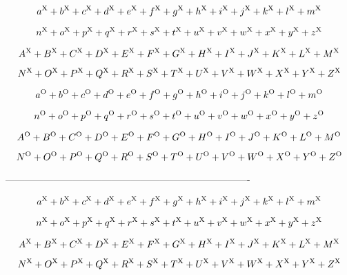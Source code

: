 

$$
a^{\rm X}+
b^{\rm X}+
c^{\rm X}+
d^{\rm X}+
e^{\rm X}+
f^{\rm X}+
g^{\rm X}+
h^{\rm X}+
i^{\rm X}+
j^{\rm X}+
k^{\rm X}+
l^{\rm X}+
m^{\rm X}
$$

$$n^{\rm X}+
o^{\rm X}+
p^{\rm X}+
q^{\rm X}+
r^{\rm X}+
s^{\rm X}+
t^{\rm X}+
u^{\rm X}+
v^{\rm X}+
w^{\rm X}+
x^{\rm X}+
y^{\rm X}+
z^{\rm X}
$$

$$
A^{\rm X}+
B^{\rm X}+
C^{\rm X}+
D^{\rm X}+
E^{\rm X}+
F^{\rm X}+
G^{\rm X}+
H^{\rm X}+
I^{\rm X}+
J^{\rm X}+
K^{\rm X}+
L^{\rm X}+
M^{\rm X}
$$

$$
N^{\rm X}+
O^{\rm X}+
P^{\rm X}+
Q^{\rm X}+
R^{\rm X}+
S^{\rm X}+
T^{\rm X}+
U^{\rm X}+
V^{\rm X}+
W^{\rm X}+
X^{\rm X}+
Y^{\rm X}+
Z^{\rm X}
$$


$$
a^{\rm O}+
b^{\rm O}+
c^{\rm O}+
d^{\rm O}+
e^{\rm O}+
f^{\rm O}+
g^{\rm O}+
h^{\rm O}+
i^{\rm O}+
j^{\rm O}+
k^{\rm O}+
l^{\rm O}+
m^{\rm O}
$$

$$
n^{\rm O}+
o^{\rm O}+
p^{\rm O}+
q^{\rm O}+
r^{\rm O}+
s^{\rm O}+
t^{\rm O}+
u^{\rm O}+
v^{\rm O}+
w^{\rm O}+
x^{\rm O}+
y^{\rm O}+
z^{\rm O}
$$

$$
A^{\rm O}+
B^{\rm O}+
C^{\rm O}+
D^{\rm O}+
E^{\rm O}+
F^{\rm O}+
G^{\rm O}+
H^{\rm O}+
I^{\rm O}+
J^{\rm O}+
K^{\rm O}+
L^{\rm O}+
M^{\rm O}
$$

$$
N^{\rm O}+
O^{\rm O}+
P^{\rm O}+
Q^{\rm O}+
R^{\rm O}+
S^{\rm O}+
T^{\rm O}+
U^{\rm O}+
V^{\rm O}+
W^{\rm O}+
X^{\rm O}+
Y^{\rm O}+
Z^{\rm O}
$$



%
---------------------------------------------------------------------------- 

$$
a^{\rm X}+
b^{\rm X}+
c^{\rm X}+
d^{\rm X}+
e^{\rm X}+
f^{\rm X}+
g^{\rm X}+
h^{\rm X}+
i^{\rm X}+
j^{\rm X}+
k^{\rm X}+
l^{\rm X}+
m^{\rm X}
$$

$$n^{\rm X}+
o^{\rm X}+
p^{\rm X}+
q^{\rm X}+
r^{\rm X}+
s^{\rm X}+
t^{\rm X}+
u^{\rm X}+
v^{\rm X}+
w^{\rm X}+
x^{\rm X}+
y^{\rm X}+
z^{\rm X}
$$

$$
A^{\rm X}+
B^{\rm X}+
C^{\rm X}+
D^{\rm X}+
E^{\rm X}+
F^{\rm X}+
G^{\rm X}+
H^{\rm X}+
I^{\rm X}+
J^{\rm X}+
K^{\rm X}+
L^{\rm X}+
M^{\rm X}
$$

$$
N^{\rm X}+
O^{\rm X}+
P^{\rm X}+
Q^{\rm X}+
R^{\rm X}+
S^{\rm X}+
T^{\rm X}+
U^{\rm X}+
V^{\rm X}+
W^{\rm X}+
X^{\rm X}+
Y^{\rm X}+
Z^{\rm X}
$$


